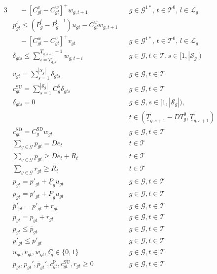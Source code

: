 \begin{alignat}{3}
& \quad - \left[ C^{v}_{gl} -C^{w}_{gl} \right]^{+} w_{g,t+1} 
&& g\in\mathcal{G}^{1*}, \, t\in \mathcal{T}^0, \, l\in\mathcal{L}_g \label{Staircase8}\\
%
& p^{l}_{gt}\leq \left( \overline{P}^{l}_{g} - \overline{P}^{l-1}_{g} \right) u_{gt} -C^{w}_{gl}w_{g,t+1} && \nonumber\\
& \quad - \left[ C^{w}_{gl}-C^{v}_{gl} \right]^{+} v_{gt} 
&& g\in\mathcal{G}^{1*}, \, t\in \mathcal{T}^0, \, l\in\mathcal{L}_g \label{Staircase9}\\
%
& \delta_{gts} \leq \sum_{i=\underline{T}_{g,s}}^{{\underline{T}_{g,s+1}-1} } w_{g,t-i}
&& g\in\mathcal{G},t\in\mathcal{T}, s\in [1,|\mathcal{S}_{g}|)
 \label{Startcost1} \\
%
& v_{gt}=\sum_{s=1}^{ |\mathcal{S}_{g}| }\delta_{gts}
&& g\in\mathcal{G},t\in\mathcal{T} \label{Startcost2}\\
%
& c_{gt}^{\text{SU}}=\sum_{s=1}^{|\mathcal{S}_{g}|} C_{g}^{\text{S}} \delta_{gts}
&& g\in\mathcal{G},t\in\mathcal{T} \label{Startcost3}\\
%
& \delta_{gts}=0
&&  g\in\mathcal{G}, s\in [1,|\mathcal{S}_{g}|), \nonumber \\ 
& && t\in\left(\underline{T}_{g,s+1}-DT^{0}_{g}, \underline{T}_{g,s+1} \right) \label{Startcost4}\\
%
& c_{gt}^{\text{SD}}= C_{g}^{\text{SD}} w_{gt} 
&& g\in\mathcal{G},t\in\mathcal{T} \label{Shutdowncost}\\
%
& \sum_{g\in \mathcal{G}} p_{gt}=\textit{De}_{t}
&&  t\in \mathcal{T} \label{System1}\\
%
& \sum_{g\in \mathcal{G}} \overline{p}_{gt} \geq \textit{De}_{t}+R_{t}
&& t\in \mathcal{T} \label{System2}\\
%
& \sum_{g\in \mathcal{G}} r_{gt} \geq R_{t}
&&  t\in \mathcal{T} \label{System3}\\
%
& p_{gt}=p'_{gt}+\underline{P}_{g} u_{gt}
&& g\in\mathcal{G}, t\in\mathcal{T} \label{relation1}\\
%
& \overline{p}_{gt}=\overline{p}'_{gt}+\underline{P}_{g} u_{gt}
&& g\in\mathcal{G},t\in\mathcal{T} \label{relation2}\\
%
& \overline{p}'_{gt}=p'_{gt}+r_{gt}
&& g\in\mathcal{G}, t\in\mathcal{T} \label{relation3}\\
%
& \overline{p}_{gt}=p_{gt}+r_{gt} 
&& g\in\mathcal{G}, t\in\mathcal{T} \label{relation4}\\
%
& p_{gt}\leq \overline{p}_{gt} 
&& g\in\mathcal{G}, t\in\mathcal{T} \label{relation5}\\
%
& p'_{gt}\leq \overline{p}'_{gt} 
&& g\in\mathcal{G}, t\in\mathcal{T} \label{relation6}\\
%
& u_{gt},v_{gt},w_{gt},\delta^{s}_{g}\in \{0, 1\}
&& g\in\mathcal{G}, t\in\mathcal{T}  \label{eq:uvw}\\
%
& p_{gt},p_{gt}',\bar{p}_{gt}',c_{gt}^{\text{p}},c_{gt}^{\text{SU}},r_{gt} \geq 0 
&& g\in\mathcal{G}, t\in\mathcal{T}  \label{eq:pp}
\end{alignat}



